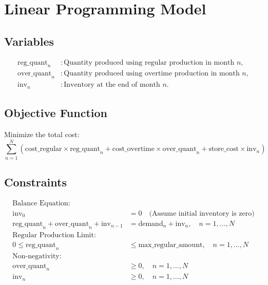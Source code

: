 \documentclass{article}
\begin{document}
\section*{Linear Programming Model}

\subsection*{Variables}
\begin{align*}
\text{reg\_quant}_n &: \text{Quantity produced using regular production in month } n, \\
\text{over\_quant}_n &: \text{Quantity produced using overtime production in month } n, \\
\text{inv}_n &: \text{Inventory at the end of month } n.
\end{align*}

\subsection*{Objective Function}
Minimize the total cost:
\[
\sum_{n=1}^{N} \left( \text{cost\_regular} \times \text{reg\_quant}_n + \text{cost\_overtime} \times \text{over\_quant}_n + \text{store\_cost} \times \text{inv}_n \right)
\]

\subsection*{Constraints}
\begin{align*}
\text{Balance Equation:} & \\
\text{inv}_0 &= 0 \quad \text{(Assume initial inventory is zero)} \\
\text{reg\_quant}_n + \text{over\_quant}_n + \text{inv}_{n-1} &= \text{demand}_{n} + \text{inv}_n, \quad n = 1, \ldots, N \\

\text{Regular Production Limit:} & \\
0 \leq \text{reg\_quant}_n &\leq \text{max\_regular\_amount}, \quad n = 1, \ldots, N \\

\text{Non-negativity:} & \\
\text{over\_quant}_n &\geq 0, \quad n = 1, \ldots, N \\
\text{inv}_n &\geq 0, \quad n = 1, \ldots, N
\end{align*}
\end{document}
